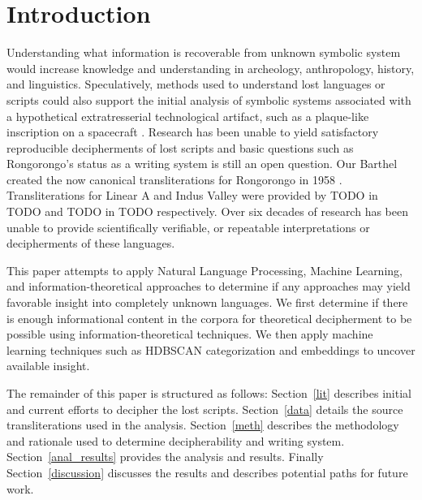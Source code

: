 \documentclass[preprint,12pt]{elsarticle}
\begin{document}


\section{Introduction}

Understanding what information is recoverable from unknown symbolic system would increase knowledge and understanding in archeology, anthropology, history, and linguistics. Speculatively, methods used to understand lost languages or scripts could also support the initial analysis of symbolic systems associated with a hypothetical extratresserial technological artifact, such as a plaque-like inscription on a spacecraft \cite{}. Research has been unable to yield satisfactory reproducible decipherments of lost scripts and basic questions such as Rongorongo's status as a writing system is still an open question\cite{}. Our Barthel created the now canonical transliterations for Rongorongo in 1958 \cite{}. Transliterations for Linear A and Indus Valley were provided by TODO in TODO \cite{} and TODO in TODO \cite{} respectively. Over six decades of research has been unable to provide scientifically verifiable, or repeatable interpretations or decipherments of these languages. 

This paper attempts to apply Natural Language Processing, Machine Learning, and information-theoretical approaches to determine if any approaches may yield favorable insight into completely unknown languages. We first determine if there is enough informational content in the corpora for theoretical decipherment to be possible using information-theoretical techniques. We then apply machine learning techniques such as HDBSCAN categorization and embeddings to uncover available insight. 


The remainder of this paper is structured as follows: Section~\ref{lit} describes initial and current efforts to decipher the lost scripts. Section~\ref{data} details the source transliterations used in the analysis. Section~\ref{meth} describes the methodology and rationale used to determine decipherability and writing system.  Section~\ref{anal_results} provides the analysis and results. Finally Section~\ref{discussion} discusses the results and describes potential paths for future work. 
\end{document}
